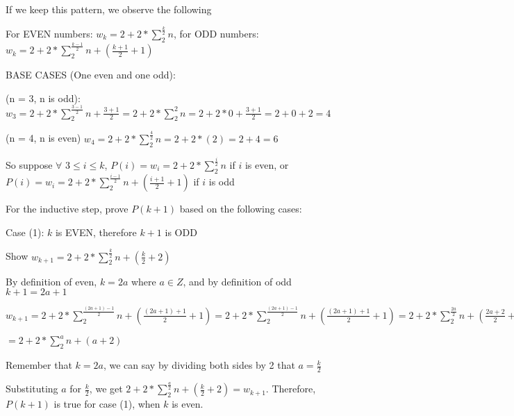 \documentclass{article}
\begin{document}
\noindent If we keep this pattern, we observe the following \par\noindent
For EVEN numbers: $w_{k} = 2 + 2 * \sum_{2}^{\frac{k}{2}}n$, for ODD numbers: $w_{k} = 2 + 2 * \sum_{2}^{\frac{k - 1}{2}}n + (\frac{k + 1}{2} + 1)$ \par\vspace{0.5cm}

\noindent BASE CASES (One even and one odd): \par\noindent
(n = 3, n is odd): $w_{3} = 2 + 2 * \sum_{2}^{\frac{3 - 1}{2}}n + \frac{3 + 1}{2}= 2 + 2 * \sum_{2}^{2}n = 2 + 2 * 0 + \frac{3 + 1}{2} = 2 + 0 + 2 = 4$ \par\noindent
(n = 4, n is even) $w_{4} = 2 + 2 * \sum_{2}^{\frac{4}{2}}n = 2 + 2 * (2) = 2 + 4 = 6$ \par\vspace{0.5cm}

\noindent So suppose $\forall$ $3 \leq i \leq k$, $P(i) = w_{i} = 2 + 2 * \sum_{2}^{\frac{i}{2}}n$ if $i$ is even, or $P(i) = w_{i} = 2 + 2 * \sum_{2}^{\frac{i - 1}{2}}n + (\frac{i + 1}{2} + 1)$ if $i$ is odd \par\vspace{0.5cm}
\noindent For the inductive step, prove $P(k + 1)$ based on the following cases: \par\vspace{0.5cm}

\noindent Case (1): $k$ is EVEN, therefore $k + 1$ is ODD \par\noindent
Show $w_{k + 1} = 2 + 2 * \sum_{2}^{\frac{k}{2}}n + (\frac{k}{2} + 2)$
\par\noindent
By definition of even, $k = 2a$ where $a \in Z$, and by definition of odd $k + 1 = 2a + 1$  
\par\noindent
$w_{k + 1} = 2 + 2 * \sum_{2}^{\frac{(2a + 1) - 1}{2}}n + (\frac{(2a + 1) + 1}{2} + 1) =  2 + 2 * \sum_{2}^{\frac{(2a + 1) - 1}{2}}n + (\frac{(2a + 1) + 1}{2} + 1) = 2 + 2 * \sum_{2}^{\frac{2a}{2}}n + (\frac{2a + 2}{2} + 1)$ \par\noindent
$ = 2 + 2 * \sum_{2}^{a}n + (a + 2)$\par\noindent
Remember that $k = 2a$, we can say by dividing both sides by 2 that $a = \frac{k}{2}$ \par\noindent Substituting $a$ for $\frac{k}{2}$, we get $2 + 2 * \sum_{2}^{\frac{a}{2}}n + (\frac{k}{2} + 2) = w_{k + 1}$.  Therefore, $P(k + 1)$ is true for case (1), when $k$ is even. \par\vspace{0.5cm}
\end{document}
